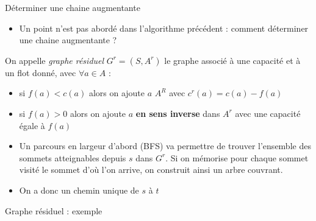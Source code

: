 \begin{frame}{Déterminer une chaine augmentante}
    \begin{itemize}
        \item Un point n'est pas abordé dans l'algorithme précédent : comment déterminer une chaine augmentante ?
    \end{itemize}
    \begin{definition}
        On appelle \emph{graphe résiduel} $G^r=(S,A^r)$ le graphe associé à une capacité et à un flot donné, avec $\forall a \in A$ :
        \begin{itemize}
            \item si $f(a) < c(a)$ alors on ajoute $a$  $A^R$ avec $c^r(a) = c(a)-f(a)$
            \item si $f(a) > 0$ alors on ajoute $a$ \textbf{en sens inverse} dans $A^r$ avec une capacité égale à $f(a)$
        \end{itemize}
    \end{definition}
    \begin{itemize}
    \item Un parcours en largeur d'abord (BFS) va permettre de trouver l'ensemble des sommets atteignables depuis $s$ dans $G^r$. Si on mémorise pour chaque sommet visité le sommet d'où l'on arrive, on construit ainsi un arbre couvrant. 
    \item On a donc un chemin unique de $s$ à $t$ 
\end{itemize}
\end{frame}


\begin{frame}{Graphe résiduel : exemple}
\begin{center}
    \scalebox{0.65}{} 
    \scalebox{0.65}{}
\end{center}
\end{frame} 



